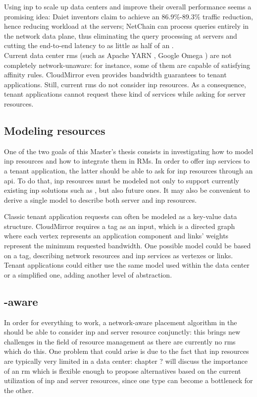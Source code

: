 Using \gls{inp} to scale up data centers and improve their overall performance seems a promising idea: Daiet \cite{daiet} inventors claim to achieve an 86.9\%-89.3\% traffic reduction, hence reducing workload at the servers;
NetChain \cite{netchain} can process queries entirely in the network data plane, thus eliminating the query processing at servers and cutting the end-to-end latency to as little as half of an .\\
Current data center \glspl{rm} (such as Apache YARN \cite{yarn}, Google Omega \cite{omega}) are not completely network-unaware: for instance, some of them are capable of satisfying affinity rules.
CloudMirror \cite{cloudmirror} even provides bandwidth guarantees to tenant applications.
Still, current \glspl{rm} do not consider \gls{inp} resources.
As a consequence, tenant applications cannot request these kind of services while asking for server resources.

\subsection{Modeling \texorpdfstring{}{INP} resources}
One of the two goals of this Master's thesis consists in investigating how to model \gls{inp} resources and how to integrate them in RMs.
In order to offer \gls{inp} services to a tenant application, the latter should be able to ask for \gls{inp} resources through an \gls{api}.
To do that, \gls{inp} resources must be modeled not only to support currently existing \gls{inp} solutions such as \cite{daiet} \cite{netchain} \cite{incbricks} \cite{sharp}, but also future ones. 
It may also be convenient to derive a single model to describe both server and \gls{inp} resources.

Classic tenant application requests can often be modeled as a key-value data structure.
CloudMirror \cite{cloudmirror} requires a \gls{tag} as an input, which is a directed graph where each vertex represents an application component and links' weights represent the minimum requested bandwidth.
One possible model could be based on a \gls{tag}, describing network resources and \gls{inp} services as vertexes or links.
Tenant applications could either use the same model used within the data center or a simplified one, adding another level of abstraction.

\subsection{\texorpdfstring{}{INP}-aware \texorpdfstring{}{Resource Managers}}
In order for everything to work, a network-aware placement algorithm in the  should be able to consider \gls{inp} and server resource conjunctly: this brings new challenges in the field of resource management as there are currently no \glspl{rm} which do this.
One problem that could arise is due to the fact that \gls{inp} resources are typically very limited in a data center: chapter ? will discuss the importance of an \gls{rm} which is flexible enough to propose alternatives based on the current utilization of \gls{inp} and server resources, since one type can become a bottleneck for the other. %